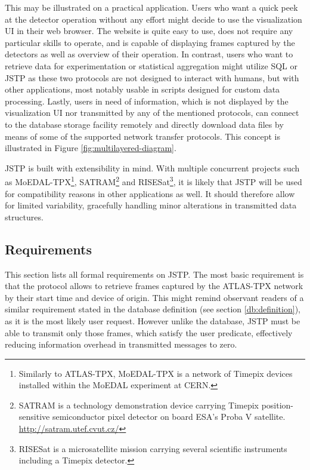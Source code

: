 This may be illustrated on a practical application. Users who want a quick peek at the detector operation without any effort might decide to use the visualization UI in their web browser. The website is quite easy to use, does not require any particular skills to operate, and is capable of displaying frames captured by the detectors as well as overview of their operation. In contrast, users who want to retrieve data for experimentation or statistical aggregation might utilize SQL or JSTP as these two protocols are not designed to interact with humans, but with other applications, most notably usable in scripts designed for custom data processing. Lastly, users in need of information, which is not displayed by the visualization UI nor transmitted by any of the mentioned protocols, can connect to the database storage facility remotely and directly download data files by means of some of the supported network transfer protocols. This concept is illustrated in Figure \ref{fig:multilayered-diagram}.

JSTP is built with extensibility in mind. With multiple concurrent projects such as MoEDAL-TPX\footnote{Similarly to ATLAS-TPX, MoEDAL-TPX is a network of Timepix devices installed within the MoEDAL experiment at CERN.}, SATRAM\footnote{SATRAM is a technology demonstration device carrying Timepix position-sensitive semiconductor pixel detector on board ESA’s Proba V satellite. \url{http://satram.utef.cvut.cz/}} and RISESat\footnote{RISESat is a microsatellite mission carrying several scientific instruments including a Timepix detector.}, it is likely that JSTP will be used for compatibility reasons in other applications as well. It should therefore allow for limited variability, gracefully handling minor alterations in transmitted data structures.

\subsection{Requirements}
This section lists all formal requirements on JSTP. The most basic requirement is that the protocol allows to retrieve frames captured by the ATLAS-TPX network by their start time and device of origin. This might remind observant readers of a similar requirement stated in the database definition (see section \ref{db:definition}), as it is the most likely user request. However unlike the database, JSTP must be able to transmit only those frames, which satisfy the user predicate, effectively reducing information overhead in transmitted messages to zero.

